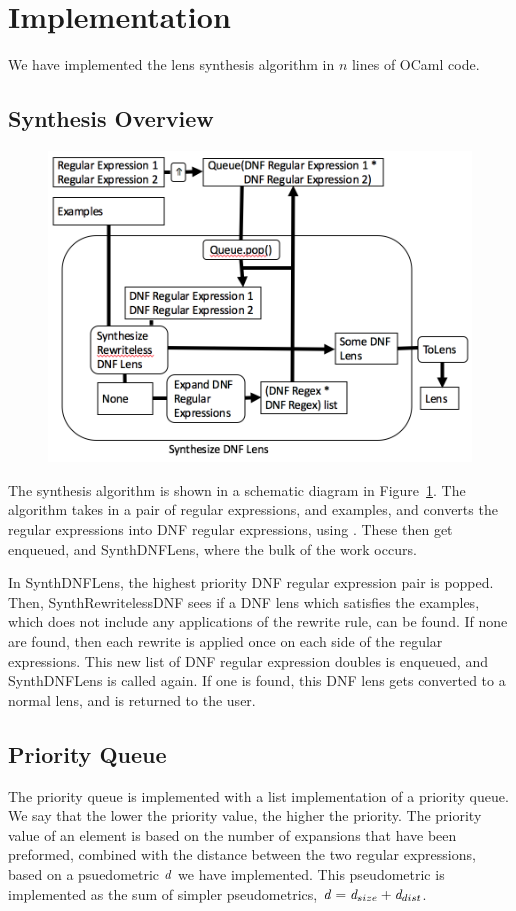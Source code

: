 \section{Implementation}
We have implemented the lens synthesis algorithm in $n$ lines of OCaml code.

\subsection{Synthesis Overview}
\begin{figure}
\includegraphics[scale=.5]{synth-lens-schematic.png}
\label{fig:synth-lens-schematic}
\end{figure}
The synthesis algorithm is shown in a schematic diagram in 
Figure~\ref{fig:synth-lens-schematic}.  The algorithm takes in a pair of
regular expressions, and examples, and converts the regular expressions into
DNF regular expressions, using \ToDNFRegex{}.
These then get enqueued, and SynthDNFLens, where the bulk of the work
occurs.

In SynthDNFLens, the highest priority DNF regular expression pair is popped.
Then, SynthRewritelessDNF sees if a DNF lens which satisfies the examples, which
does not include any applications of the rewrite rule, can be found.
If none are found, then each rewrite is applied once on each side of the regular
expressions.
This new list of DNF regular expression doubles is enqueued, and SynthDNFLens is
called again.
If one is found, this DNF lens gets converted to a normal lens, and is returned
to the user.

\subsection{Priority Queue}
The priority queue is implemented with a list implementation of a priority queue.
We say that the lower the priority value, the higher the priority.
The priority value of an element is based on the number of expansions that have been
preformed, combined with the distance between the two regular expressions, based
on a psuedometric $\mathit{d}$ we have implemented.  This pseudometric is implemented
as the sum of simpler pseudometrics,
$\mathit{d} = \mathit{d}_{size}+\mathit{d}_{dist}$.

